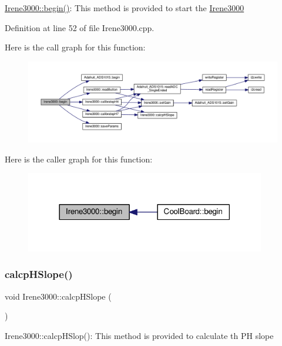 \hyperlink{class_irene3000_ad5891806c500ae1007afe52b9e304c2b}{Irene3000\+::begin()}\+: This method is provided to start the \hyperlink{class_irene3000}{Irene3000} 

Definition at line 52 of file Irene3000.\+cpp.

Here is the call graph for this function\+:\nopagebreak
\begin{figure}[H]
\begin{center}
\leavevmode
\includegraphics[width=350pt]{class_irene3000_ad5891806c500ae1007afe52b9e304c2b_cgraph}
\end{center}
\end{figure}
Here is the caller graph for this function\+:\nopagebreak
\begin{figure}[H]
\begin{center}
\leavevmode
\includegraphics[width=297pt]{class_irene3000_ad5891806c500ae1007afe52b9e304c2b_icgraph}
\end{center}
\end{figure}
\mbox{\label{class_irene3000_a81f6a79e546679692053f7ac1af49613}} 
\subsubsection{\texorpdfstring{calcp\+H\+Slope()}{calcpHSlope()}}
{\footnotesize\ttfamily void Irene3000\+::calcp\+H\+Slope (\begin{DoxyParamCaption}{ }\end{DoxyParamCaption})}

Irene3000\+::calcp\+H\+Slop()\+: This method is provided to calculate th PH slope 

